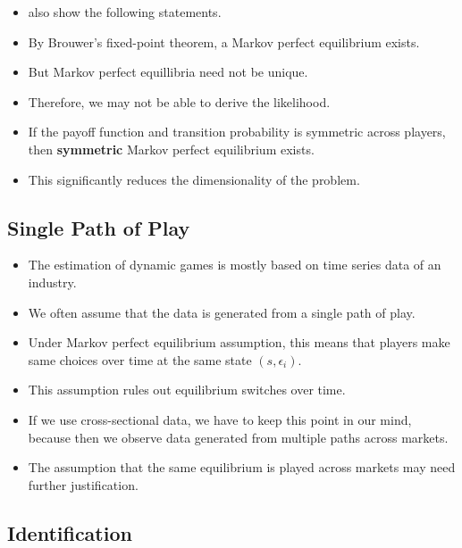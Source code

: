 \documentclass[]{book}
\providecommand{\tightlist}{%
  \setlength{\itemsep}{0pt}\setlength{\parskip}{0pt}}
\begin{document}
\begin{itemize}
\tightlist
\item
  \citet{pesendorferAsymptoticLeastSquares2008} also show the following
  statements.
\item
  By Brouwer's fixed-point theorem, a Markov perfect equilibrium exists.
\item
  But Markov perfect equillibria need not be unique.
\item
  Therefore, we may not be able to derive the likelihood.
\item
  If the payoff function and transition probability is symmetric across
  players, then \textbf{symmetric} Markov perfect equilibrium exists.
\item
  This significantly reduces the dimensionality of the problem.
\end{itemize}

\subsection{Single Path of Play}\label{single-path-of-play}

\begin{itemize}
\tightlist
\item
  The estimation of dynamic games is mostly based on time series data of
  an industry.
\item
  We often assume that the data is generated from a single path of play.
\item
  Under Markov perfect equilibrium assumption, this means that players
  make same choices over time at the same state \((s, \epsilon_i)\).
\item
  This assumption rules out equilibrium switches over time.
\item
  If we use cross-sectional data, we have to keep this point in our
  mind, because then we observe data generated from multiple paths
  across markets.
\item
  The assumption that the same equilibrium is played across markets may
  need further justification.
\end{itemize}

\subsection{Identification}\label{identification-1}
\end{document}
